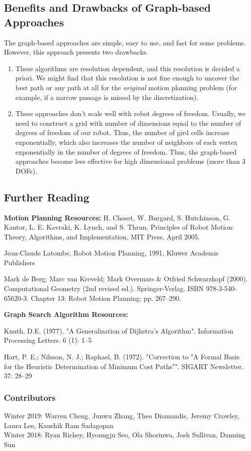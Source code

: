 \documentclass[twoside]{article}
\begin{document}
\subsection{Benefits and Drawbacks of Graph-based Approaches}
The graph-based approaches are simple, easy to use, and fast for some problems. However, this approach presents two drawbacks.
\begin{enumerate}
\item These algorithms are resolution dependent, and this resolution is decided a priori. We might find that this resolution is not fine enough to uncover the best path or any path at all for the \textit{original} motion planning problem (for example, if a narrow passage is missed by the discretization).
\item These approaches don't scale well with robot degrees of freedom. Usually, we need to construct a grid with number of dimensions equal to the number of degrees of freedom of our robot. Thus, the number of gird cells increase exponentially, which also increases the number of neighbors of each vertex exponentially in the number of degrees of freedom. Thus, the graph-based approaches become less effective for high dimensional problems (more than 3 DOFs).
\end{enumerate}

\subsection{Further Reading}

\textbf{Motion Planning Resources:}
H. Choset, W. Burgard, S. Hutchinson, G. Kantor, L. E. Kavraki, K. Lynch, and S. Thrun, Principles of Robot Motion: Theory, Algorithms, and Implementation, MIT Press, April 2005.

Jean-Claude Latombe, Robot Motion Planning, 1991, Kluwer Academic Publishers

Mark de Berg; Marc van Kreveld; Mark Overmars & Otfried Schwarzkopf (2000). Computational Geometry (2nd revised ed.). Springer-Verlag. ISBN 978-3-540-65620-3. Chapter 13: Robot Motion Planning: pp. 267–290.

\textbf{Graph Search Algorithm Resources:}

Knuth, D.E. (1977). "A Generalization of Dijkstra's Algorithm". Information Processing Letters. 6 (1): 1–5

Hart, P. E.; Nilsson, N. J.; Raphael, B. (1972). "Correction to "A Formal Basis for the Heuristic Determination of Minimum Cost Paths"". SIGART Newsletter. 37: 28–29

\printbibliography

\subsubsection*{Contributors}
Winter 2019: Warren Cheng,  Junwu Zhang, Theo Diamandis, Jeremy Crowley, Laura Lee, Kaushik Ram Sadagopan\\
Winter 2018: Ryan Richey, Hyoungju Seo, Ola Shorinwa, Josh Sullivan, Danning Sun
\end{document}

